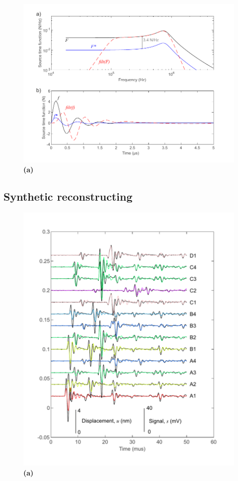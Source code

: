 \documentclass[preprint,3p, 11pt,authoryear]{elsarticle}
\begin{document}
{\begin{figure}[ht]
     	\centering
\includegraphics[scale= 1]{FIG9.pdf} 
\caption{\textbf{(a)}  }
	\label{fig9} 
\end{figure}

\subsection{Synthetic reconstructing}

\begin{figure}[ht]
     	\centering
\includegraphics[scale= 1]{FIG10.pdf} 
\caption{\textbf{(a)}  }
	\label{fig10} 
\end{figure}




}
\end{document}
